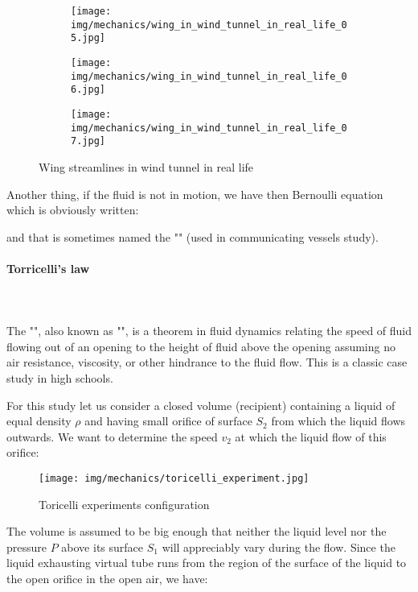 	\begin{figure}[H]
		\centering
		\begin{subfigure}{.45\textwidth}
		  \centering
		  \texttt{[image: img/mechanics/wing\_in\_wind\_tunnel\_in\_real\_life\_05.jpg]}
		\end{subfigure}
		\begin{subfigure}{.45\textwidth}
		  \centering
		  \texttt{[image: img/mechanics/wing\_in\_wind\_tunnel\_in\_real\_life\_06.jpg]}
		\end{subfigure}
	\end{figure}
	
	\begin{figure}[H]
		\centering
		\begin{subfigure}{.45\textwidth}
		  \centering
		  \texttt{[image: img/mechanics/wing\_in\_wind\_tunnel\_in\_real\_life\_07.jpg]}
		\end{subfigure}
		\caption{Wing streamlines in wind tunnel in real life}
	\end{figure}
	
	Another thing, if the fluid is not in motion, we have then Bernoulli equation which is obviously written:
	
	and that is sometimes named the "" (used in communicating vessels study).
	
	\paragraph{Torricelli's law}\mbox{}\\\\
	The "", also known as "", is a theorem in fluid dynamics relating the speed of fluid flowing out of an opening to the height of fluid above the opening assuming no air resistance, viscosity, or other hindrance to the fluid flow. This is a classic case study in high schools.
	
	For this study let us consider a closed volume (recipient) containing a liquid of equal density $\rho$ and having small orifice of surface $S_2$ from which the liquid flows outwards. We want to determine the speed $v_2$ at which the liquid flow of this orifice:
	\begin{figure}[H]
		\centering
		\texttt{[image: img/mechanics/toricelli\_experiment.jpg]}
		\caption{Toricelli experiments configuration}
	\end{figure}
	The volume is assumed to be big enough that neither the liquid level nor the pressure $P$ above its surface $S_1$ will appreciably vary during the flow. Since the liquid exhausting virtual tube runs from the region of the surface of the liquid to the open orifice in the open air, we have:
	
